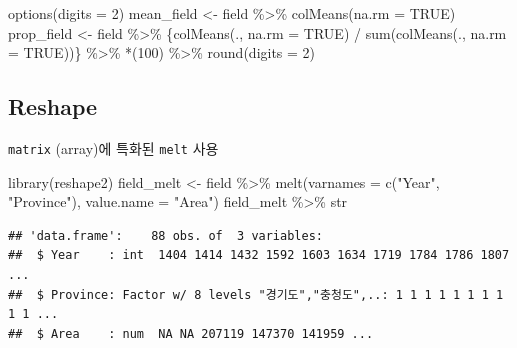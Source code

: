 \documentclass[
]{article}
\newenvironment{Shaded}{\begin{snugshade}}{\end{snugshade}}
\newcommand{\AttributeTok}[1]{\textcolor[rgb]{0.77,0.63,0.00}{#1}}
\newcommand{\ConstantTok}[1]{\textcolor[rgb]{0.00,0.00,0.00}{#1}}
\newcommand{\DecValTok}[1]{\textcolor[rgb]{0.00,0.00,0.81}{#1}}
\newcommand{\FunctionTok}[1]{\textcolor[rgb]{0.00,0.00,0.00}{#1}}
\newcommand{\NormalTok}[1]{#1}
\newcommand{\OtherTok}[1]{\textcolor[rgb]{0.56,0.35,0.01}{#1}}
\newcommand{\SpecialCharTok}[1]{\textcolor[rgb]{0.00,0.00,0.00}{#1}}
\newcommand{\StringTok}[1]{\textcolor[rgb]{0.31,0.60,0.02}{#1}}
\begin{document}
\begin{Shaded}
\begin{Highlighting}[]
\FunctionTok{options}\NormalTok{(}\AttributeTok{digits =} \DecValTok{2}\NormalTok{)}
\NormalTok{mean\_field }\OtherTok{\textless{}{-}}\NormalTok{ field }\SpecialCharTok{\%\textgreater{}\%} \FunctionTok{colMeans}\NormalTok{(}\AttributeTok{na.rm =} \ConstantTok{TRUE}\NormalTok{)}
\NormalTok{prop\_field }\OtherTok{\textless{}{-}}\NormalTok{ field }\SpecialCharTok{\%\textgreater{}\%} 
\NormalTok{  \{}\FunctionTok{colMeans}\NormalTok{(., }\AttributeTok{na.rm =} \ConstantTok{TRUE}\NormalTok{) }\SpecialCharTok{/} \FunctionTok{sum}\NormalTok{(}\FunctionTok{colMeans}\NormalTok{(., }\AttributeTok{na.rm =} \ConstantTok{TRUE}\NormalTok{))\} }\SpecialCharTok{\%\textgreater{}\%}
  \StringTok{\textasciigrave{}}\AttributeTok{*}\StringTok{\textasciigrave{}}\NormalTok{(}\DecValTok{100}\NormalTok{) }\SpecialCharTok{\%\textgreater{}\%}
  \FunctionTok{round}\NormalTok{(}\AttributeTok{digits =} \DecValTok{2}\NormalTok{)}
\end{Highlighting}
\end{Shaded}

\hypertarget{reshape}{%
\subsection{Reshape}\label{reshape}}

\texttt{matrix} (array)에 특화된 \texttt{melt} 사용

\begin{Shaded}
\begin{Highlighting}[]
\FunctionTok{library}\NormalTok{(reshape2)}
\NormalTok{field\_melt }\OtherTok{\textless{}{-}}\NormalTok{ field }\SpecialCharTok{\%\textgreater{}\%}
  \FunctionTok{melt}\NormalTok{(}\AttributeTok{varnames =} \FunctionTok{c}\NormalTok{(}\StringTok{"Year"}\NormalTok{, }\StringTok{"Province"}\NormalTok{), }\AttributeTok{value.name =} \StringTok{"Area"}\NormalTok{)}
\NormalTok{field\_melt }\SpecialCharTok{\%\textgreater{}\%}\NormalTok{ str}
\end{Highlighting}
\end{Shaded}

\begin{verbatim}
## 'data.frame':    88 obs. of  3 variables:
##  $ Year    : int  1404 1414 1432 1592 1603 1634 1719 1784 1786 1807 ...
##  $ Province: Factor w/ 8 levels "경기도","충청도",..: 1 1 1 1 1 1 1 1 1 1 ...
##  $ Area    : num  NA NA 207119 147370 141959 ...
\end{verbatim}
\end{document}
